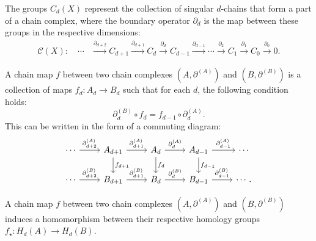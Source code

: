 \begin{example}
	The groups $C_{d}(X)$ represent the collection of singular $d$-chains that form
	a part of a chain complex, where the boundary operator $\partial_{d}$ is the map between these groups in the respective dimensions:
	\begin{align}
		\mathcal{C}(X):\quad \cdots &\xrightarrow{\partial_{d+2}}C_{d+1} \xrightarrow{\partial_{d+1}} C_{d} \xrightarrow{\partial_d}C_{d-1} \xrightarrow{\partial_{d-1}}\cdots \xrightarrow{\partial_2}C_{1} \xrightarrow{\partial_1} C_{0} \xrightarrow{\partial_0}0.                              
	\end{align}
\end{example}

\begin{definition}
	A chain map $f$ between two chain complexes $(A, \partial^{(A)})$ and $(B,\partial
	^{(B)})$ is a collection of maps $f_{d}: A_{d} \rightarrow B_{d}$ such that for
	each $d$, the following condition holds:
	\begin{equation}
		\partial^{(B)}_{d}\circ f_{d} = f_{d-1}\circ \partial^{(A)}_{d}.
	\end{equation}
	This can be written in the form of a commuting diagram:
	\begin{equation}
		\begin{tikzcd}
			\cdots \arrow[r, "\partial^{(A)}_{d+2}"] & A_{d+1} \arrow[r, "\partial^{(A)}_{d+1}"]
			\arrow[d, "f_{d+1}"] & A_d \arrow[r, "\partial^{(A)}_{d}"] \arrow[d, "f_d"]
			& A_{d-1} \arrow[r, "\partial^{(A)}_{d-1}"] \arrow[d, "f_{d-1}"] & \cdots \\
			\cdots \arrow[r, "\partial^{(B)}_{d+2}"] & B_{d+1} \arrow[r, "\partial^{(B)}_{d+1}"]
			& B_d \arrow[r, "\partial^{(B)}_d"] & B_{d-1} \arrow[r, "\partial^{(B)}_{d-1}"]
			& \cdots.
		\end{tikzcd}
	\end{equation}
\end{definition}

\begin{theorem}{\cite[Theorem 1.3.1]{Weibel1994}}
	\label{chainmaps}
	A chain map $f$ between two chain complexes $(A, \partial^{(A)}
	)$ and $(B, \partial^{(B)})$ induces a homomorphism between their respective homology
	groups $f_\star: H_d(A) \rightarrow H_d(B)$.
\end{theorem}

